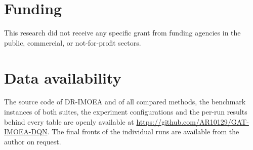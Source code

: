 \documentclass[a4paper,fleqn]{cas-dc}
\newcommand{\ours}{DR-IMOEA}   %
\begin{document}
\section*{Funding}
This research did not receive any specific grant from funding agencies in the public, commercial, or not-for-profit
sectors.


\section*{Data availability}
The source code of \ours{} and of all compared methods, the benchmark instances of both suites, the experiment
configurations and the per-run results behind every table are openly available at
\url{https://github.com/AR10129/GAT-IMOEA-DQN}. The final fronts of the individual runs are available from the author
on request.



\end{document}
